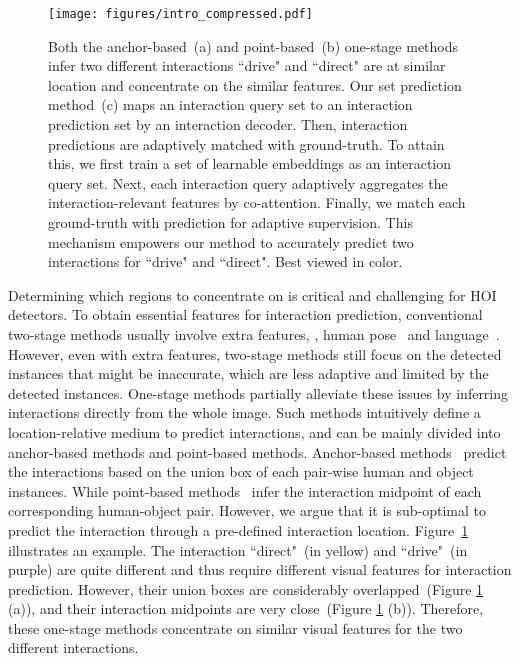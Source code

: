\documentclass[final]{cvpr}
\begin{document}
\begin{figure}[t]
  \begin{center}
  \texttt{[image: figures/intro\_compressed.pdf]}
  \end{center}\vspace{-4mm}
  \caption{Both the anchor-based~(a) and point-based~(b) one-stage methods infer two different interactions ``drive" and ``direct" are at similar location and concentrate on the similar features. Our set prediction method~(c) maps an interaction query set to an interaction prediction set by an interaction decoder. Then, interaction predictions are adaptively matched with ground-truth.
  To attain this, we first train a set of learnable embeddings as an interaction query set. Next, each interaction query adaptively aggregates the interaction-relevant features by co-attention. 
  Finally, we match each ground-truth with prediction for adaptive supervision. This mechanism empowers our method to accurately predict two interactions for ``drive" and ``direct". Best viewed in color.}\vspace{5mm}
  \label{fig:intro}
\end{figure}
Determining which regions to concentrate on is critical and challenging for HOI detectors.
To obtain essential features for interaction prediction, conventional two-stage methods usually involve extra features, \eg, human pose~\cite{shen2018scaling, feng2019turbo, Li_2019_CVPR, Gupta_2019_ICCV} and language~\cite{Xu_2019_CVPR, Gao-ECCV-DRG, Liu20a, kim2020detecting}. However, even with extra features, two-stage methods still focus on the detected instances that might be inaccurate, which are less adaptive and limited by the detected instances. One-stage methods partially alleviate these issues by inferring interactions directly from the whole image. Such methods intuitively define a location-relative medium to predict interactions, and can be mainly divided into anchor-based methods and point-based methods. Anchor-based methods~\cite{Kim2020_unidet} predict the interactions based on the union box of each pair-wise human and object instances. While point-based methods~\cite{liao2020ppdm} infer the interaction midpoint of each corresponding human-object pair. However, we argue that it is sub-optimal to predict the interaction through a pre-defined interaction location. 
Figure~\ref{fig:intro} illustrates an example. The interaction ``direct"~(in yellow) and ``drive"~(in purple) are quite different and thus require different visual features for interaction prediction. However, their union boxes are considerably overlapped~(Figure \ref{fig:intro} (a)), and their interaction midpoints are very close~(Figure \ref{fig:intro} (b)). Therefore, these one-stage methods concentrate on similar visual features for the two different interactions. 
\end{document}
